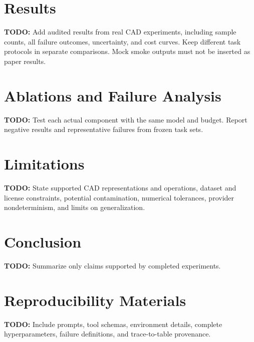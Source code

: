 \documentclass[11pt]{article}
\begin{document}
\section{Results}
\textbf{TODO:} Add audited results from real CAD experiments, including
sample counts, all failure outcomes, uncertainty, and cost curves. Keep
different task protocols in separate comparisons. Mock smoke outputs must
not be inserted as paper results.

\section{Ablations and Failure Analysis}
\textbf{TODO:} Test each actual component with the same model and budget.
Report negative results and representative failures from frozen task sets.

\section{Limitations}
\textbf{TODO:} State supported CAD representations and operations,
dataset and license constraints, potential contamination, numerical
tolerances, provider nondeterminism, and limits on generalization.

\section{Conclusion}
\textbf{TODO:} Summarize only claims supported by completed experiments.




\appendix
\section{Reproducibility Materials}
\textbf{TODO:} Include prompts, tool schemas, environment details, complete
hyperparameters, failure definitions, and trace-to-table provenance.
\end{document}
